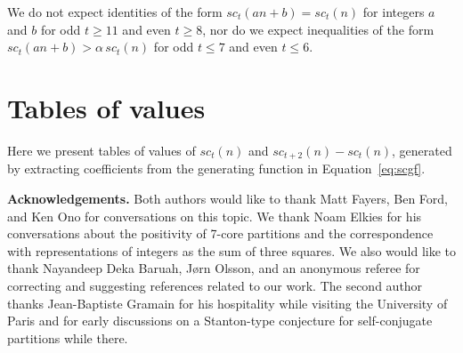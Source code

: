 \documentclass[12pt,leqno]{amsart}
\numberwithin{equation}{section}
\theoremstyle{definition}
\begin{document}
We do not expect identities of the form $sc_t(an+b)=sc_t(n)$ for integers $a$ and $b$ for odd $t\geq 11$ and even $t\geq 8$, nor do we expect inequalities of the form $sc_t(an+b)>\alpha\,sc_t(n)$ for odd $t\leq 7$ and even $t\leq 6$.

\appendix
\section{Tables of values}
\label{sec:appendix}

Here we present tables of values of $sc_t(n)$ and $sc_{t+2}(n)-sc_t(n)$, generated by extracting coefficients from the generating function in Equation~\eqref{eq:scgf}.

\bigskip
{\bf Acknowledgements.} Both authors would like to thank Matt Fayers, Ben Ford, and Ken Ono for conversations on this topic.  We thank Noam Elkies for his conversations about the positivity of 7-core partitions and the correspondence with representations of integers as the sum of three squares.  We also would like to thank Nayandeep Deka Baruah, J\o rn Olsson, and an anonymous referee for correcting and suggesting references related to our work.  The second author thanks Jean-Baptiste Gramain for his hospitality while visiting the University of Paris and for early discussions on a Stanton-type conjecture for self-conjugate partitions while there.
\end{document}
